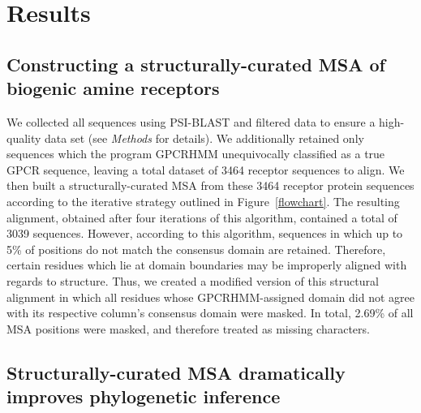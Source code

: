 \documentclass[fleqn,10pt]{wlpeerj}
\begin{document}
\section*{Results}

\subsection*{Constructing a structurally-curated MSA of biogenic amine receptors}
We collected all sequences using PSI-BLAST and filtered data to ensure a high-quality data set (see \emph{Methods} for details). We additionally retained only sequences which the program GPCRHMM unequivocally classified as a true GPCR sequence, leaving a total dataset of 3464 receptor sequences to align. We then built a structurally-curated MSA from these 3464 receptor protein sequences according to the iterative strategy outlined in Figure~\ref{flowchart}. The resulting alignment, obtained after four iterations of this algorithm, contained a total of 3039 sequences. However, according to this algorithm, sequences in which up to 5\% of positions do not match the consensus domain are retained. Therefore, certain residues which lie at domain boundaries may be improperly aligned with regards to structure. Thus, we created a modified version of this structural alignment in which all residues whose GPCRHMM-assigned domain did not agree with its respective column's consensus domain were masked. In total, 2.69\% of all MSA positions were masked, and therefore treated as missing characters.

\subsection*{Structurally-curated MSA dramatically improves phylogenetic inference}
\end{document}
